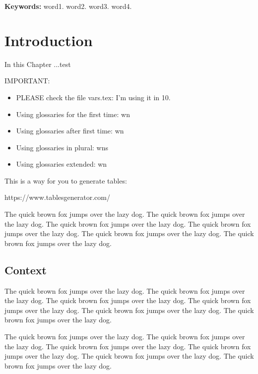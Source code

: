 \documentclass[11pt,a4paper]{report}
\begin{document}
\textbf{Keywords:} word1. word2. word3. word4.

\tableofcontents
\glsaddall
\printglossary[type=\acronymtype]
\printglossary[type=main,title={Glossary},toctitle={Glossary}]

\chapter{Introduction}
\label{chap:introduction}

In this Chapter ...test

IMPORTANT:
\begin{itemize}
    \item PLEASE check the file vars.tex: I'm using it in 10\kbps.
    \item Using glossaries for the first time: \gls{wn}
    \item Using glossaries after first time: \gls{wn}
    \item Using glossaries in plural: \glspl{wn}
    \item Using glossaries extended: \glsdesc{wn}
\end{itemize}




This is a way for you to generate tables:

https://www.tablesgenerator.com/

The quick brown fox jumps over the lazy dog. The quick brown fox jumps over the lazy dog. The quick brown fox jumps over the lazy dog. The quick brown fox jumps over the lazy dog. The quick brown fox jumps over the lazy dog. The quick brown fox jumps over the lazy dog.

\section{Context}
\label{sec:context}
The quick brown fox jumps over the lazy dog. The quick brown fox jumps over the lazy dog. The quick brown fox jumps over the lazy dog. The quick brown fox jumps over the lazy dog. The quick brown fox jumps over the lazy dog. The quick brown fox jumps over the lazy dog.

The quick brown fox jumps over the lazy dog. The quick brown fox jumps over the lazy dog. The quick brown fox jumps over the lazy dog. The quick brown fox jumps over the lazy dog. The quick brown fox jumps over the lazy dog. The quick brown fox jumps over the lazy dog.
\end{document}
